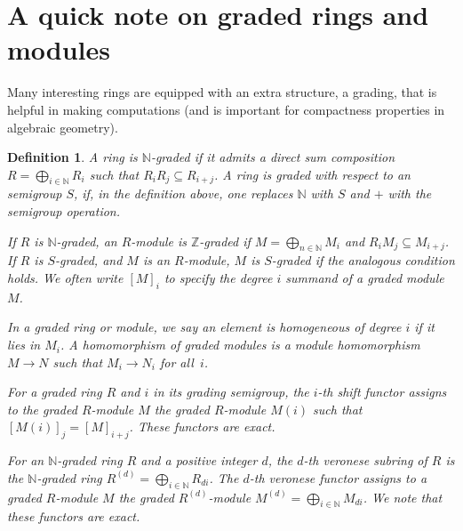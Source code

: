 \documentclass[11pt]{book}
\newtheorem{definition}[theorem]{Definition}
\numberwithin{equation}{section}
\numberwithin{theorem}{chapter}
\theoremstyle{definition}
\newtheorem*{basic properties}{Basic Properties}
\newtheorem*{Important Remark}{Important Remark}
\newtheorem{remark}[theorem]{Remark}
\theoremstyle{remark}
\newcommand{\NN}{\mathbb{N}}
\newcommand{\ZZ}{\mathbb{Z}}
\newcommand{\m}{\mathfrak{m}}
\newcommand{\Hom}{\operatorname{Hom}}
\begin{document}
%	

\section{A quick note on graded rings and modules}

Many interesting rings are equipped with an extra structure, a grading, that is helpful in making computations (and is important for compactness properties in algebraic geometry).

\begin{definition} A ring is \emph{$\NN$-graded}\index{$\NN$-graded} if it admits a direct sum composition $R=\bigoplus_{i\in \NN} R_i$ such that $R_i R_j \subseteq R_{i+j}$. A ring is graded with respect to an semigroup $S$, if, in the definition above, one replaces $\NN$ with $S$ and $+$ with the semigroup operation.
	
If $R$ is $\NN$-graded, an $R$-module is \emph{$\ZZ$-graded} if $M=\bigoplus_{n\in \NN} M_i$ and $R_i M_j \subseteq M_{i+j}$. If $R$ is $S$-graded, and $M$ is an $R$-module, $M$ is $S$-graded if the analogous condition holds. We often write $[M]_i$ to specify the degree $i$ summand of a graded module $M$.

In a graded ring or module, we say an element is \emph{homogeneous} of degree $i$ if it lies in $M_i$. A \emph{homomorphism of graded modules} is a module homomorphism $M\to N$ such that $M_i\to N_i$ for all~$i$.

For a graded ring $R$ and $i$ in its grading semigroup, the \emph{$i$-th shift functor} assigns to the graded $R$-module $M$ the graded $R$-module $M(i)$ such that $[M(i)]_j=[M]_{i+j}$. These functors are exact.

For an $\NN$-graded ring $R$ and a positive integer $d$, the \emph{$d$-th veronese subring} of $R$ is the $\NN$-graded ring $R^{(d)}=\bigoplus_{i\in \NN} R_{di}$. The \emph{$d$-th veronese functor} assigns to a graded $R$-module $M$ the graded $R^{(d)}$-module $M^{(d)}=\bigoplus_{i\in \NN} M_{di}$. We note that these functors are exact.
\end{definition}
\end{document}

